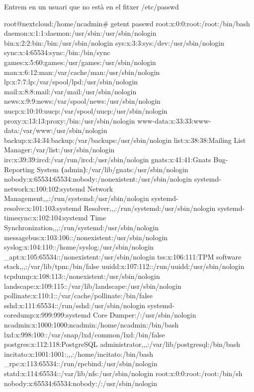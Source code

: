 \documentclass[
  10pt,
]{krantz}
\newenvironment{Shaded}{\begin{snugshade}}{\end{snugshade}}
\newcommand{\ErrorTok}[1]{\textcolor[rgb]{0.64,0.00,0.00}{\textbf{#1}}}
\newcommand{\ExtensionTok}[1]{#1}
\newcommand{\KeywordTok}[1]{\textcolor[rgb]{0.13,0.29,0.53}{\textbf{#1}}}
\newcommand{\NormalTok}[1]{#1}
\begin{document}
Entrem en un usuari que no està en el fitxer /etc/passwd

\begin{Shaded}
\begin{Highlighting}[]
\ExtensionTok{root@nextcloud:/home/ncadmin\#}\NormalTok{ getent passwd}
\ExtensionTok{root:x:0:0:root:/root:/bin/bash}
\ExtensionTok{daemon:x:1:1:daemon:/usr/sbin:/usr/sbin/nologin}
\ExtensionTok{bin:x:2:2:bin:/bin:/usr/sbin/nologin}
\ExtensionTok{sys:x:3:3:sys:/dev:/usr/sbin/nologin}
\ExtensionTok{sync:x:4:65534:sync:/bin:/bin/sync}
\ExtensionTok{games:x:5:60:games:/usr/games:/usr/sbin/nologin}
\ExtensionTok{man:x:6:12:man:/var/cache/man:/usr/sbin/nologin}
\ExtensionTok{lp:x:7:7:lp:/var/spool/lpd:/usr/sbin/nologin}
\ExtensionTok{mail:x:8:8:mail:/var/mail:/usr/sbin/nologin}
\ExtensionTok{news:x:9:9:news:/var/spool/news:/usr/sbin/nologin}
\ExtensionTok{uucp:x:10:10:uucp:/var/spool/uucp:/usr/sbin/nologin}
\ExtensionTok{proxy:x:13:13:proxy:/bin:/usr/sbin/nologin}
\ExtensionTok{www{-}data:x:33:33:www{-}data:/var/www:/usr/sbin/nologin}
\ExtensionTok{backup:x:34:34:backup:/var/backups:/usr/sbin/nologin}
\ExtensionTok{list:x:38:38:Mailing}\NormalTok{ List Manager:/var/list:/usr/sbin/nologin}
\ExtensionTok{irc:x:39:39:ircd:/var/run/ircd:/usr/sbin/nologin}
\ExtensionTok{gnats:x:41:41:Gnats}\NormalTok{ Bug{-}Reporting System }\ErrorTok{(}\ExtensionTok{admin}\KeywordTok{)}\ExtensionTok{:/var/lib/gnats:/usr/sbin/nologin}
\ExtensionTok{nobody:x:65534:65534:nobody:/nonexistent:/usr/sbin/nologin}
\ExtensionTok{systemd{-}network:x:100:102:systemd}\NormalTok{ Network Management,,,:/run/systemd:/usr/sbin/nologin}
\ExtensionTok{systemd{-}resolve:x:101:103:systemd}\NormalTok{ Resolver,,,:/run/systemd:/usr/sbin/nologin}
\ExtensionTok{systemd{-}timesync:x:102:104:systemd}\NormalTok{ Time Synchronization,,,:/run/systemd:/usr/sbin/nologin}
\ExtensionTok{messagebus:x:103:106::/nonexistent:/usr/sbin/nologin}
\ExtensionTok{syslog:x:104:110::/home/syslog:/usr/sbin/nologin}
\ExtensionTok{\_apt:x:105:65534::/nonexistent:/usr/sbin/nologin}
\ExtensionTok{tss:x:106:111:TPM}\NormalTok{ software stack,,,:/var/lib/tpm:/bin/false}
\ExtensionTok{uuidd:x:107:112::/run/uuidd:/usr/sbin/nologin}
\ExtensionTok{tcpdump:x:108:113::/nonexistent:/usr/sbin/nologin}
\ExtensionTok{landscape:x:109:115::/var/lib/landscape:/usr/sbin/nologin}
\ExtensionTok{pollinate:x:110:1::/var/cache/pollinate:/bin/false}
\ExtensionTok{sshd:x:111:65534::/run/sshd:/usr/sbin/nologin}
\ExtensionTok{systemd{-}coredump:x:999:999:systemd}\NormalTok{ Core Dumper:/:/usr/sbin/nologin}
\ExtensionTok{ncadmin:x:1000:1000:ncadmin:/home/ncadmin:/bin/bash}
\ExtensionTok{lxd:x:998:100::/var/snap/lxd/common/lxd:/bin/false}
\ExtensionTok{postgres:x:112:118:PostgreSQL}\NormalTok{ administrator,,,:/var/lib/postgresql:/bin/bash}
\ExtensionTok{incitato:x:1001:1001:,,,:/home/incitato:/bin/bash}
\ExtensionTok{\_rpc:x:113:65534::/run/rpcbind:/usr/sbin/nologin}
\ExtensionTok{statd:x:114:65534::/var/lib/nfs:/usr/sbin/nologin}
\ExtensionTok{root:x:0:0:root:/root:/bin/sh}
\ExtensionTok{nobody:x:65534:65534:nobody:/:/usr/sbin/nologin}
\end{Highlighting}
\end{Shaded}
\end{document}
